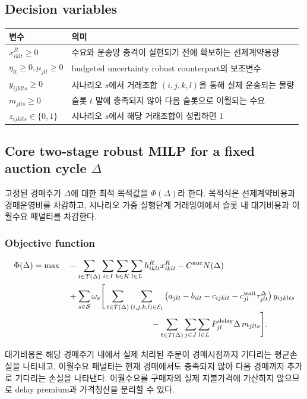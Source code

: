 \documentclass[11pt,a4paper]{article}
\newcommand{\Scen}{\mathcal{S}}
\newcommand{\Eset}{\mathcal{E}}
\begin{document}
\subsection{Decision variables}
\begin{longtable}{@{}p{}p{}@{}}
\toprule
변수 & 의미 \\
\midrule
$x^R_{iklt}\ge0$ & 수요와 운송망 충격이 실현되기 전에 확보하는 선제계약용량 \\
$\eta_{lt}\ge0,\mu_{jlt}\ge0$ & budgeted uncertainty robust counterpart의 보조변수 \\
$y_{ijklts}\ge0$ & 시나리오 $s$에서 거래조합 $(i,j,k,l)$을 통해 실제 운송되는 물량 \\
$m_{jlts}\ge0$ & 슬롯 $t$ 말에 충족되지 않아 다음 슬롯으로 이월되는 수요 \\
$z_{ijklts}\in\{0,1\}$ & 시나리오 $s$에서 해당 거래조합이 성립하면 1 \\
\bottomrule
\end{longtable}

\subsection{Core two-stage robust MILP for a fixed auction cycle $\Delta$}
고정된 경매주기 $\Delta$에 대한 최적 목적값을 $\Phi(\Delta)$라 한다. 목적식은 선제계약비용과 경매운영비를 차감하고, 시나리오 가중 실행단계 거래잉여에서 슬롯 내 대기비용과 이월수요 패널티를 차감한다.

\subsubsection{Objective function}
\begin{align}
\Phi(\Delta)=\max\quad
&-\sum_{t\in T(\Delta)}\sum_{i\in I}\sum_{k\in K}\sum_{l\in L}
 h^R_{iklt}x^R_{iklt}
-C^{\mathrm{auc}}N(\Delta) \nonumber\\
&+\sum_{s\in\Scen}\omega_s\Bigg[
\sum_{t\in T(\Delta)}\sum_{(i,j,k,l)\in\Eset_t}
\left(a_{jlt}-b_{ilt}-c_{ijklt}-c^{\mathrm{wait}}_{jl}\tau^{\Delta}_{jlt}\right)y_{ijklts}
\nonumber\\[-1mm]
&\hspace{35mm}-\sum_{t\in T(\Delta)}\sum_{j\in J}\sum_{l\in L}
P^{\mathrm{delay}}_{jl}\Delta\,m_{jlts}
\Bigg].
\label{eq:objective}
\end{align}

대기비용은 해당 경매주기 내에서 실제 처리된 주문이 경매시점까지 기다리는 평균손실을 나타내고, 이월수요 패널티는 현재 경매에서도 충족되지 않아 다음 경매까지 추가로 기다리는 손실을 나타낸다. 이월수요를 구매자의 실제 지불가격에 가산하지 않으므로 delay premium과 가격청산을 분리할 수 있다.
\end{document}
